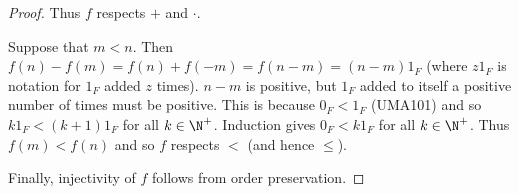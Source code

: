 \begin{proof}
    Thus $f$ respects $+$ and $\cdot$.

    Suppose that $m < n$.
    Then $f(n) - f(m) = f(n) + f(-m) = f(n - m) = (n - m) 1_F$ (where
    $z 1_F$ is notation for $1_F$ added $z$ times).
    $n - m$ is positive, but $1_F$ added to itself a positive number of times
    must be positive.
    This is because $0_F < 1_F$ (UMA101) and so $k 1_F < (k + 1) 1_F$ for all
    $k \in \N^+$.
    Induction gives $0_F < k 1_F$ for all $k \in \N^+$.
    Thus $f(m) < f(n)$ and so $f$ respects $<$ (and hence $\le$).

    Finally, injectivity of $f$ follows from order preservation.
\end{proof}

